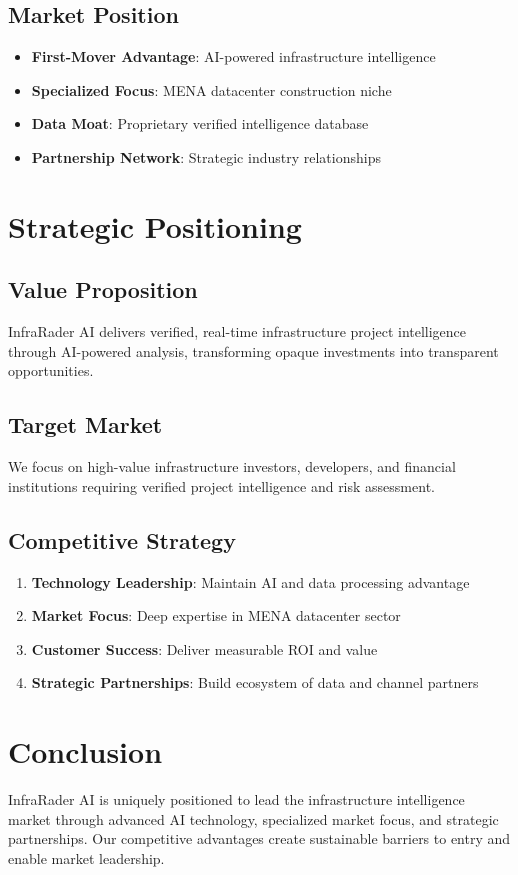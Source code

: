 \documentclass[business]{../templates/infraradar-main}
\begin{document}
\subsection{Market Position}
\begin{itemize}
    \item \textbf{First-Mover Advantage}: AI-powered infrastructure intelligence
    \item \textbf{Specialized Focus}: MENA datacenter construction niche
    \item \textbf{Data Moat}: Proprietary verified intelligence database
    \item \textbf{Partnership Network}: Strategic industry relationships
\end{itemize}

\section{Strategic Positioning}

\subsection{Value Proposition}
InfraRader AI delivers verified, real-time infrastructure project intelligence through AI-powered analysis, transforming opaque investments into transparent opportunities.

\subsection{Target Market}
We focus on high-value infrastructure investors, developers, and financial institutions requiring verified project intelligence and risk assessment.

\subsection{Competitive Strategy}
\begin{enumerate}
    \item \textbf{Technology Leadership}: Maintain AI and data processing advantage
    \item \textbf{Market Focus}: Deep expertise in MENA datacenter sector
    \item \textbf{Customer Success}: Deliver measurable ROI and value
    \item \textbf{Strategic Partnerships}: Build ecosystem of data and channel partners
\end{enumerate}

\section{Conclusion}

InfraRader AI is uniquely positioned to lead the infrastructure intelligence market through advanced AI technology, specialized market focus, and strategic partnerships. Our competitive advantages create sustainable barriers to entry and enable market leadership.
\end{document}
